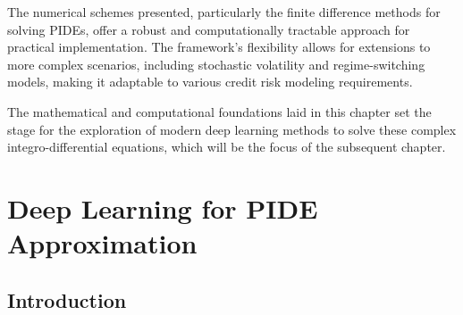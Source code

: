 \documentclass[11pt,twoside,openright]{report}
\begin{document}
The numerical schemes presented, particularly the finite difference methods for solving PIDEs, offer a robust and computationally tractable approach for practical implementation. The framework's flexibility allows for extensions to more complex scenarios, including stochastic volatility and regime-switching models, making it adaptable to various credit risk modeling requirements.

The mathematical and computational foundations laid in this chapter set the stage for the exploration of modern deep learning methods to solve these complex integro-differential equations, which will be the focus of the subsequent chapter.

\chapter{Deep Learning for PIDE Approximation}
\label{ch:deep_learning_for_pide_approximation}

\section{Introduction}
\label{sec:Resources}
\end{document}
